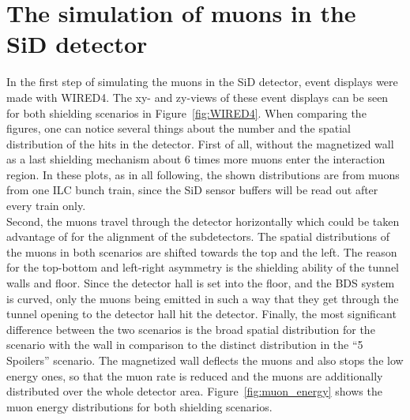 \section{The simulation of muons in the SiD detector}
\label{Detector}

In the first step of simulating the muons in the SiD detector, event displays were made with WIRED4\cite{Wired4}.
The xy- and zy-views of these event displays can be seen for both shielding scenarios in Figure~\ref{fig:WIRED4}.
When comparing the figures, one can notice several things about the number and the spatial distribution of the hits in the detector.
First of all, without the magnetized wall as a last shielding mechanism about 6 times more muons enter the interaction region.
In these plots, as in all following, the shown distributions are from muons from one ILC bunch train, since the SiD sensor buffers will be read out after every train only.\\
Second, the muons travel through the detector horizontally which could be taken advantage of for the alignment of the subdetectors.
The spatial distributions of the muons in both scenarios are shifted towards the top and the left.
The reason for the top-bottom and left-right asymmetry is the shielding ability of the tunnel walls and floor.
Since the detector hall is set into the floor, and the BDS system is curved, only the muons being emitted in such a way that they get through the tunnel opening to the detector hall hit the detector.
Finally, the most significant difference between the two scenarios is the broad spatial distribution for the scenario with the wall in comparison to the distinct distribution in the ``5 Spoilers'' scenario.
The magnetized wall deflects the muons and also stops the low energy ones, so that the muon rate is reduced and the muons are additionally distributed over the whole detector area.
Figure~\ref{fig:muon_energy} shows the muon energy distributions for both shielding scenarios.

